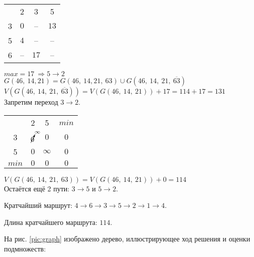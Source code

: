 \begin{table}[H]
\begin{center}
	\def\tabcolsep{18pt}
	\def\arraystretch{1.5}
	\fontsize{13}{14}\selectfont
	\begin{tabular}{|c||c|c|c|}
		\hline 
	  	& 2 & 3 & 5 \\ 
		\hhline{|=#=|=|=|} 
		3 & $0$ & -- & $13$ \\ 
		\hline 
		5 & $4$ & -- & -- \\ 
		\hline 
		6 & -- & \cellcolor{pink} $17$ & -- \\
		\hline
	\end{tabular}  
\end{center}
\end{table}

$max = 17\ \Rightarrow 5 \rightarrow 2$\\
	
$G(46,\ 14, 21) = G(46,\ 14, 21,\ 63) \cup G(46,\ 14,\ 21,\ \overline{63})$\\
$V(G(46,\ 14,\ 21,\ \overline{63})) = V(G(46,\ 14,\ 21)) + 17 = 114 + 17 = 131$\\
Запретим переход $3 \rightarrow 2$.

\begin{table}[H]
\begin{center}
	\def\tabcolsep{18pt}
	\def\arraystretch{1.5}
	\fontsize{13}{14}\selectfont
	\begin{tabular}{|c||c|c||c|}
		\hline 
	  	& 2 & 5 & $min$ \\ 
		\hhline{|=#=|=#=|} 
		3 & $\cancelto{\infty}{0}$ & $0$ & $0$\\ 
		\hline 
		5 & $0$ & $\infty$ & $0$ \\ 		
		\hhline{|=#=|=#=|}
		$min$ & $0$ & $0$ & $0$ \\
		\hline		
	\end{tabular}  
\end{center}
\end{table}

$V(G(46,\ 14,\ 21,\ 63)) = V(G(46,\ 14,\ 21)) + 0 = 114$\\

Остаётся ещё 2 пути: $3 \rightarrow 5$ и $5 \rightarrow 2$.

Кратчайший маршрут: $4 \rightarrow 6 \rightarrow 3 \rightarrow 5 \rightarrow 2 \rightarrow 1 \rightarrow 4$.

Длина кратчайшего маршрута: $114$.

На рис. \ref{pic:graph} изображено дерево, иллюстрирующее ход решения и оценки подмножеств:

